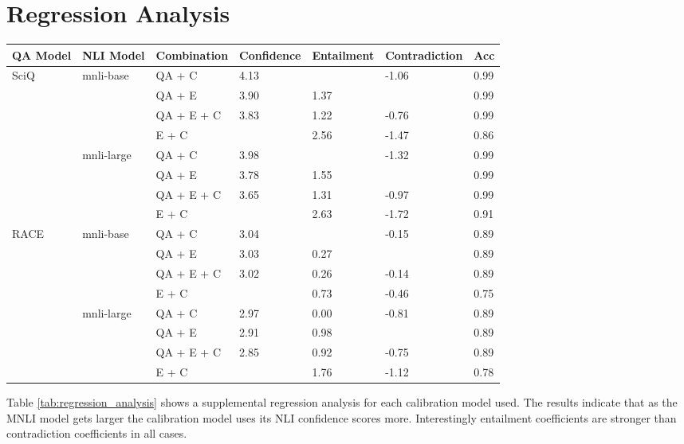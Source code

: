 \documentclass[11pt]{article}
\begin{document}
\section{Regression Analysis}
\begin{table*}[h]
\centering
\begin{tabular}{lllllll}
\hline
QA Model & NLI Model & Combination & Confidence & Entailment & Contradiction & Acc \\ \hline
SciQ & mnli-base & QA + C & 4.13 &  & -1.06 & 0.99 \\
 &  & QA + E & 3.90 & 1.37 &  & 0.99 \\
 &  & QA + E + C & 3.83 & 1.22 & -0.76 & 0.99 \\
 &  & E + C &  & 2.56 & -1.47 & 0.86 \\
 & mnli-large & QA + C & 3.98 &  & -1.32 & 0.99 \\
 &  & QA + E & 3.78 & 1.55 &  & 0.99 \\
 &  & QA + E + C & 3.65 & 1.31 & -0.97 & 0.99 \\
 &  & E + C &  & 2.63 & -1.72 & 0.91 \\
RACE & mnli-base & QA + C & 3.04 &  & -0.15 & 0.89 \\
 &  & QA + E & 3.03 & 0.27 &  & 0.89 \\
 &  & QA + E + C & 3.02 & 0.26 & -0.14 & 0.89 \\
 &  & E + C &  & 0.73 & -0.46 & 0.75 \\
 & mnli-large & QA + C & 2.97 & 0.00 & -0.81 & 0.89 \\
 &  & QA + E & 2.91 & 0.98 &  & 0.89 \\
 &  & QA + E + C & 2.85 & 0.92 & -0.75 & 0.89 \\
 &  & E + C &  & 1.76 & -1.12 & 0.78 \\ \hline
\end{tabular}
\caption{Regression analysis for each mnli-based nli model with each QA model used calibration with logistic regression multiple choice settings. Accuracy is the evaluation metric used.}
\label{tab:regression_analysis}
\end{table*}
Table \ref{tab:regression_analysis} shows a supplemental regression analysis for each calibration model used. The results indicate that as the MNLI model gets larger the calibration model uses its NLI confidence scores more. Interestingly entailment coefficients are stronger than contradiction coefficients in all cases.
\end{document}
